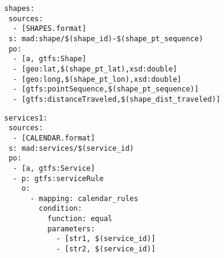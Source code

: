 \begin{lstlisting}[caption=Shapes TripleMap, label=lst:shapes, basicstyle=\small,frame=single]
shapes:
 sources:
  - [SHAPES.format]
 s: mad:shape/$(shape_id)-$(shape_pt_sequence)
 po:
  - [a, gtfs:Shape]
  - [geo:lat,$(shape_pt_lat),xsd:double]
  - [geo:long,$(shape_pt_lon),xsd:double]
  - [gtfs:pointSequence,$(shape_pt_sequence)]
  - [gtfs:distanceTraveled,$(shape_dist_traveled)]
\end{lstlisting}

\begin{lstlisting}[caption=Service\_Calendar TripleMap, label=lst:service1, basicstyle=\small,frame=single]
services1:
 sources:
  - [CALENDAR.format]
 s: mad:services/$(service_id)
 po:
  - [a, gtfs:Service]
  - p: gtfs:serviceRule
    o:
      - mapping: calendar_rules
        condition:
          function: equal
          parameters:
            - [str1, $(service_id)]
            - [str2, $(service_id)]
\end{lstlisting}




